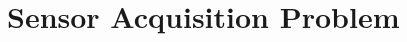 \documentclass{article}
\begin{document}






\section{Sensor Acquisition Problem}
\label{sec:Setup}
\end{document}

